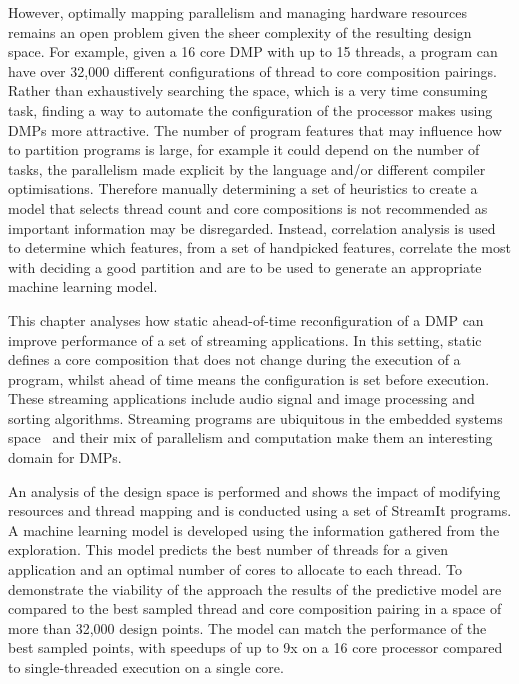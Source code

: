 However, optimally mapping parallelism and managing hardware resources remains an open problem given the sheer complexity of the resulting design space.
For example, given a 16 core DMP with up to 15 threads, a program can have over 32,000 different configurations of thread to core composition pairings.
Rather than exhaustively searching the space, which is a very time consuming task, finding a way to automate the configuration of the processor makes using DMPs more attractive.
The number of program features that may influence how to partition programs is large, for example it could depend on the number of tasks, the parallelism made explicit by the language and/or different compiler optimisations.
Therefore manually determining a set of heuristics to create a model that selects thread count and core compositions is not recommended as important information may be disregarded.
Instead, correlation analysis is used to determine which features, from a set of handpicked features, correlate the most with deciding a good partition and are to be used to generate an appropriate machine learning model.

This chapter analyses how static ahead-of-time reconfiguration of a DMP can improve performance of a set of streaming applications.
In this setting, static defines a core composition that does not change during the execution of a program, whilst ahead of time means the configuration is set before execution.
These streaming applications include audio signal and image processing and sorting algorithms.
Streaming programs are ubiquitous in the embedded systems space~\cite{theis2002streamit} and their mix of parallelism and computation make them an interesting domain for DMPs.

An analysis of the design space is performed and shows the impact of modifying resources and thread mapping and is conducted using a set of StreamIt programs.
A machine learning model is developed using the information gathered from the exploration.
This model predicts the best number of threads for a given application and an optimal number of cores to allocate to each thread.
To demonstrate the viability of the approach the results of the predictive model are compared to the best sampled thread and core composition pairing in a space of more than 32,000 design points.
The model can match the performance of the best sampled points, with speedups of up to 9x on a 16 core processor compared to single-threaded execution on a single core. 

